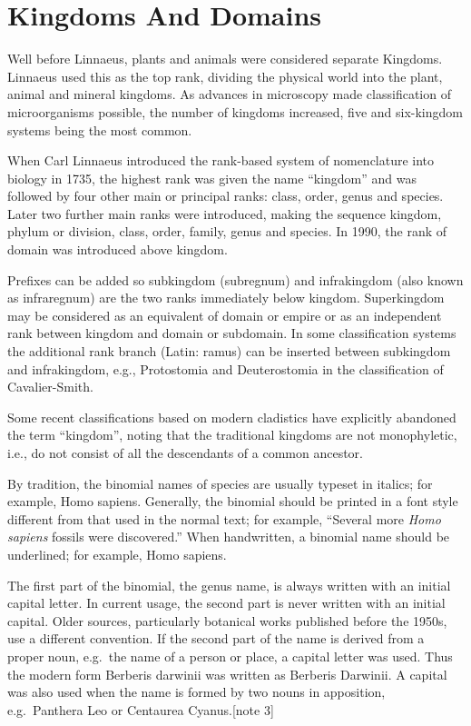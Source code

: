 \hypertarget{kingdoms-and-domains}{%
\section{Kingdoms And Domains}\label{kingdoms-and-domains}}

Well before Linnaeus, plants and animals were considered separate Kingdoms. Linnaeus used this as the top rank, dividing the physical world into the plant, animal and mineral kingdoms. As advances in microscopy made classification of microorganisms possible, the number of kingdoms increased, five and six-kingdom systems being the most common.

When Carl Linnaeus introduced the rank-based system of nomenclature into biology in 1735, the highest rank was given the name ``kingdom'' and was followed by four other main or principal ranks: class, order, genus and species. Later two further main ranks were introduced, making the sequence kingdom, phylum or division, class, order, family, genus and species. In 1990, the rank of domain was introduced above kingdom.

Prefixes can be added so subkingdom (subregnum) and infrakingdom (also known as infraregnum) are the two ranks immediately below kingdom. Superkingdom may be considered as an equivalent of domain or empire or as an independent rank between kingdom and domain or subdomain. In some classification systems the additional rank branch (Latin: ramus) can be inserted between subkingdom and infrakingdom, e.g., Protostomia and Deuterostomia in the classification of Cavalier-Smith.

Some recent classifications based on modern cladistics have explicitly abandoned the term ``kingdom'', noting that the traditional kingdoms are not monophyletic, i.e., do not consist of all the descendants of a common ancestor.

By tradition, the binomial names of species are usually typeset in italics; for example, Homo sapiens. Generally, the binomial should be printed in a font style different from that used in the normal text; for example, ``Several more \emph{Homo sapiens} fossils were discovered.'' When handwritten, a binomial name should be underlined; for example, Homo sapiens.

The first part of the binomial, the genus name, is always written with an initial capital letter. In current usage, the second part is never written with an initial capital. Older sources, particularly botanical works published before the 1950s, use a different convention. If the second part of the name is derived from a proper noun, e.g.~the name of a person or place, a capital letter was used. Thus the modern form Berberis darwinii was written as Berberis Darwinii. A capital was also used when the name is formed by two nouns in apposition, e.g.~Panthera Leo or Centaurea Cyanus.{[}note 3{]}

